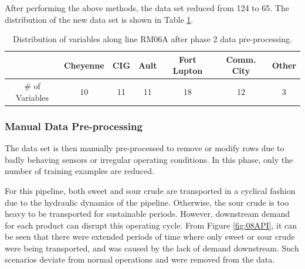 After performing the above methods, the data set reduced from 124 to 65. The distribution of the new data set is shown in Table \ref{tab:08Ph2Data}.
\begin{table}[h]
    \centering
    {
    \begin{tabular}{ c | c | c | c | c | c | c}
             &  Cheyenne & CIG & Ault & Fort Lupton & Comm. City & Other      \\
        \hline
        \# of Variables  &  10  &  11  &  11  &  18  &  12  &  3  \\
    \end{tabular}}
    \caption{Distribution of variables along line RM06A after phase 2 data pre-processing.}
    \label{tab:08Ph2Data}
\end{table}

\subsubsection{Manual Data Pre-processing}
The data set is then manually pre-processed to remove or modify rows due to badly behaving sensors or irregular operating conditions.  In this phase, only the number of training examples are reduced.

For this pipeline, both sweet and sour crude are transported in a cyclical fashion due to the hydraulic dynamics of the pipeline. Otherwise, the sour crude is too heavy to be transported for sustainable periods. However, downstream demand for each product can disrupt this operating cycle.  From Figure \ref{fig:08API}, it can be seen that there were extended periods of time where only sweet or sour crude were being transported, and was caused by the lack of demand downstream.  Such scenarios deviate from normal operations and were removed from the data.


